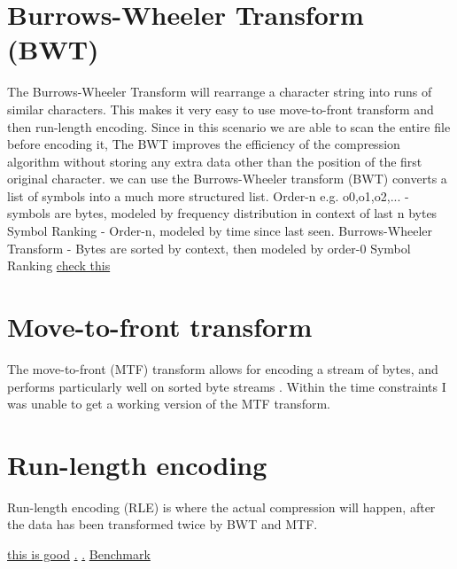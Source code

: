 \documentclass[a4paper, 11pt]{article}
\numberwithin{equation}{section}
\theoremstyle{plain}
\theoremstyle{definition}
\begin{document}
\section{Burrows-Wheeler Transform (BWT)}
The Burrows-Wheeler Transform will rearrange a character string into runs of similar characters. 
This makes it very easy to use move-to-front transform and then run-length encoding.
Since in this scenario we are able to scan the entire file before encoding it, 
The BWT improves the efficiency of the compression algorithm without storing any extra data other than the 
position of the first original character. 
we can use the Burrows-Wheeler transform (BWT) converts a list of symbols into a much more structured list.
Order-n e.g. o0,o1,o2,... - symbols are bytes, modeled by frequency distribution in context of last n bytes
Symbol Ranking - Order-n, modeled by time since last seen.
Burrows-Wheeler Transform - Bytes are sorted by context, then modeled by order-0 Symbol Ranking
\href{https://en.wikipedia.org/wiki/Burrows-Wheeler_transform}{check this}


\section{Move-to-front transform}
The move-to-front (MTF) transform allows for encoding a stream of bytes, 
and performs particularly well on sorted byte streams \cite{TextBenchmark}.
\cite{GoogleCompression}
Within the time constraints I was unable to get a working version of the MTF transform. 


\section{Run-length encoding}
Run-length encoding (RLE) is where the actual compression will happen, after the data has been transformed twice by 
BWT and MTF.

\href{https://sites.google.com/site/datacompressionguide/}{this is good}
\href{https://en.wikipedia.org/wiki/PAQ}{.}
\href{https://tarsa.github.io/lossless-benchmark/}{.}
\href{https://www.mattmahoney.net/dc/text.html}{Benchmark}





\end{document}
